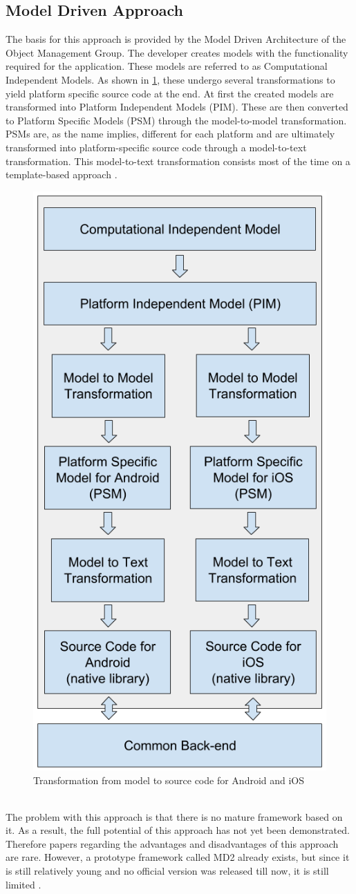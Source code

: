 \documentclass[Bachelor,BIF,english]{twbook}
\begin{document}
\subsection{Model Driven Approach}
The basis for this approach is provided by the Model Driven Architecture of the Object Management Group. The developer creates models with the functionality required for the application. These models are referred to as Computational Independent Models. As shown in \ref{Fig1}, these undergo several transformations to yield platform specific source code at the end. At first the created models are transformed into Platform Independent Models (PIM). These are then converted to Platform Specific Models (PSM) through the model-to-model transformation. PSMs are, as the name implies, different for each platform and are ultimately transformed into platform-specific source code through a model-to-text transformation. This model-to-text transformation consists most of the time on a template-based approach \cite[p.~4]{7479278} \cite[p.~3]{7934674}.
\begin{figure}[!htbp]
\centering
\includegraphics[width=0.5\linewidth]{PICs/MDA.png}
\caption{Transformation from model to source code for Android and iOS \cite[p.~4]{7479278} \cite[p.~3]{7934674}}\label{Fig1}
\end{figure}
\\[\baselineskip]
The problem with this approach is that there is no mature framework based on it. As a result, the full potential of this approach has not yet been demonstrated. Therefore papers regarding the advantages and disadvantages of this approach are rare. However, a prototype framework called MD2 \cite{MD2} already exists, but since it is still relatively young and no official version was released till now, it is still limited \cite[p.~3-4]{7934674}.
\end{document}
